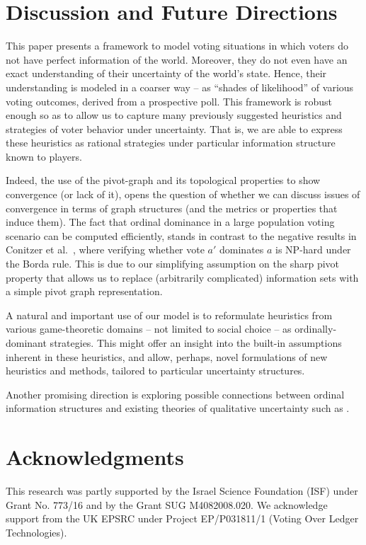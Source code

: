 \documentclass[letterpaper]{article} %
\begin{document}
\section{Discussion and Future Directions}

This paper presents a framework to model voting situations in which voters do not have perfect information of the world. Moreover, they do not even have an exact understanding of their uncertainty of the world's state. Hence, their understanding is modeled in a coarser way -- as ``shades of likelihood'' of various voting outcomes, derived from a prospective poll. This framework is robust enough so as to allow us to capture many previously suggested heuristics and strategies of voter behavior under uncertainty. That is, we are able to express these heuristics as rational strategies under particular information structure known to players.

Indeed, the use of the pivot-graph and its topological properties to show convergence (or lack of it), opens the question of whether we can discuss issues of convergence in terms of graph structures (and the metrics or properties that induce them).
 The fact that ordinal dominance in a large population voting scenario can be computed efficiently, stands in contrast to the negative results in Conitzer et al.~, where verifying whether vote $a'$ dominates $a$ is NP-hard under the Borda rule. This is due to our simplifying assumption on the sharp pivot property that allows us to replace (arbitrarily complicated) information sets with a simple pivot graph representation. 

A natural and important use of our model is to reformulate heuristics from various game-theoretic domains -- not limited to social choice -- as ordinally-dominant strategies. This might offer an insight into the built-in assumptions inherent in these heuristics, and allow, perhaps, novel formulations of new heuristics and methods, tailored to particular uncertainty structures.

Another promising direction is exploring possible connections between ordinal information structures and existing theories of qualitative uncertainty such as \cite{Hal97}.

\section*{Acknowledgments}

This research was partly supported by the Israel Science Foundation (ISF) under Grant No. 773/16 and by the Grant SUG  M4082008.020. We acknowledge support from the UK EPSRC under Project EP/P031811/1 (Voting Over Ledger Technologies).





\end{document}
